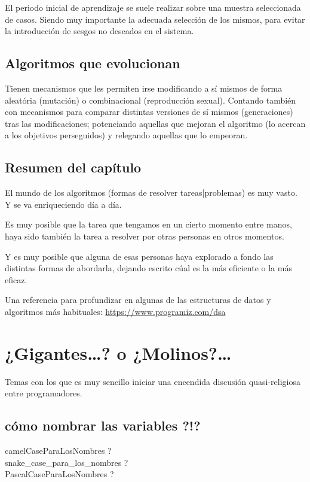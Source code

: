 \documentclass[spanish,12pt,a4paper,final,oneside]{book}
\begin{document}
El periodo inicial de aprendizaje se suele realizar sobre una muestra seleccionada de casos. Siendo muy importante la adecuada selección de los mismos, para evitar la introducción de sesgos no deseados en el sistema.

\section{Algoritmos que evolucionan}
Tienen mecanismos que les permiten irse modificando a sí mismos de forma aleatória (mutación) o combinacional (reproducción sexual). Contando también con mecanismos para comparar distintas versiones de sí mismos (generaciones) tras las modificaciones; potenciando aquellas que mejoran el algoritmo (lo acercan a los objetivos perseguidos) y relegando aquellas que lo empeoran.

\newpage
\section*{Resumen del capítulo}
El mundo de los algoritmos (formas de resolver tareas|problemas) es muy vasto. Y se va enriqueciendo día a día.

Es muy posible que la tarea que tengamos en un cierto momento entre manos, haya sido también la tarea a resolver por otras personas en otros momentos.

Y es muy posible que alguna de esas personas haya explorado a fondo las distintas formas de abordarla, dejando escrito cúal es la más eficiente o la más eficaz.


\vspace{2cm}
Una referencia para profundizar en algunas de las estructuras de datos y algoritmos más habituales: \url{https://www.programiz.com/dsa}


\chapter{¿Gigantes\ldots? o ¿Molinos?\ldots}
Temas con los que es muy sencillo iniciar una encendida discusión quasi-religiosa entre programadores. 

\section{cómo nombrar las variables ?!?}
camelCaseParaLosNombres ?
\\snake\_case\_para\_los\_nombres ?
\\PascalCaseParaLosNombres ?
\end{document}
